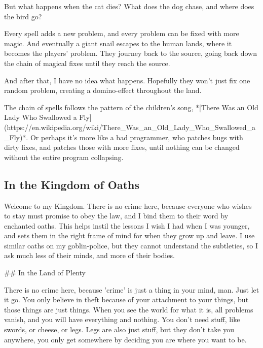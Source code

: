 But what happens when the cat dies?
What does the dog chase, and where does the bird go?

Every spell adds a new problem, and every problem can be fixed with more magic.
And eventually a giant snail escapes to the human lands, where it becomes the players' problem.
They journey back to the source, going back down the chain of magical fixes until they reach the source.

And after that, I have no idea what happens.
Hopefully they won't just fix one random problem, creating a domino-effect throughout the land.


The chain of spells follows the pattern of the children's song, *[There Was an Old Lady Who Swallowed a Fly](https://en.wikipedia.org/wiki/There_Was_an_Old_Lady_Who_Swallowed_a_Fly)*.
Or perhaps it's more like a bad programmer, who patches bugs with dirty fixes, and patches those with more fixes, until nothing can be changed without the entire program collapsing.

\subsection{In the Kingdom of Oaths}

\begin{exampletext}
  Welcome to my Kingdom.
  There is no crime here, because everyone who wishes to stay must promise to obey the law, and I bind them to their word by enchanted oaths.
  This helps instil the lessons I wish I had when I was younger, and sets them in the right frame of mind for when they grow up and leave.
  I use similar oaths on my goblin-police, but they cannot understand the subtleties, so I ask much less of their minds, and more of their bodies.

\end{exampletext}

## In the Land of Plenty

\begin{exampletext}
  There is no crime here, because 'crime' is just a thing in your mind, man.
  Just let it go.
  You only believe in theft because of your attachment to your things, but those things are just things.
  When you see the world for what it is, all problems vanish, and you will have everything and nothing.
  You don't need stuff, like swords, or cheese, or legs.
  Legs are also just stuff, but they don't take you anywhere, you only get somewhere by deciding you are where you want to be.
\end{exampletext}

